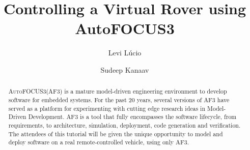 \documentclass[runningheads]{llncs}
\newcommand\levi[1]{\nb{Levi}{\textcolor{teal}{#1}}}
\newcommand{\af}{\textsc{AF3}\xspace}
\newcommand{\autofocus}{\textsc{AutoFOCUS3}\xspace}
\begin{document}
% 
\title{Controlling a Virtual Rover using AutoFOCUS3}
%
%
\author{Levi L\'ucio \and
Sudeep Kanaav} 
%
%
%
\maketitle              %
%
\begin{abstract}
\autofocus (\af) is a mature model-driven engineering environment to develop
software for embedded systems. For the past 20 years, several versions of \af
have served as a platform for experimenting with cutting edge research ideas in
Model-Driven Development.
\af is a tool that fully encompasses the software lifecycle, from requirements,
to architecture, simulation, deployment, code generation and verification. The
attendees of this tutorial will be given the unique opportunity to model and deploy
software on a real remote-controlled vehicle, using only \af.\levi{finish this
abstract}
 
\end{abstract}
  




  









 

 

\end{document}
